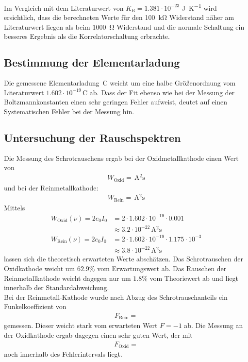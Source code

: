 Im Vergleich mit dem Literaturwert von $K_\text{B} = 1.381 \cdot 10^{-23}$ \si{\joule\per\kelvin} wird ersichtlich, dass die berechneten Werte für den \SI{100}{\kilo\ohm} Widerstand näher am Literaturwert liegen als beim \SI{1000}{\ohm} Widerstand und die normale Schaltung ein besseres Ergebnis als die Korrelatorschaltung erbrachte.
\subsection{Bestimmung der Elementarladung}
Die gemessene Elementarladung $ \, \si{\coulomb}$ weicht um eine halbe Größenordnung vom Literaturwert $1.602\cdot 10^{-19}\,\si{\coulomb}$ ab. Dass der Fit ebenso wie bei der Messung der Boltzmannkonstanten einen sehr geringen Fehler aufweist, deutet auf einen Systematischen Fehler bei der Messung hin.
\subsection{Untersuchung der Rauschspektren}
Die Messung des Schrotrauschens ergab bei der Oxidmetallkathode einen Wert von
\begin{align*}
W_\text{Oxid} = \,\si{\ampere^2\second}
\end{align*}
und bei der Reinmetallkathode:
\begin{align*}
W_\text{Rein} = \,\si{\ampere^2\second}
\end{align*}
Mittels
\begin{align*}
W_\text{Oxid}(\nu) = 2e_0I_0 &= 2\cdot 1.602\cdot10^{-19}\cdot 0.001 \\
&\approx 3.2\cdot10^{-22}\,\si{\ampere^2\second}\\
W_\text{Rein}(\nu) = 2e_0I_0 &= 2\cdot 1.602\cdot10^{-19}\cdot 1.175 \cdot10^{-3} \\
&\approx 3.8\cdot10^{-22}\,\si{\ampere^2\second}
\end{align*}
lassen sich die theoretisch erwarteten Werte abschätzen. Das Schrotrauschen der Oxidkathode weicht um $62.9\%$ vom Erwartungswert ab. Das Rauschen der Reinmetallkathode weicht dagegen nur um $1.8\%$ vom Theoriewert ab und liegt innerhalb der Standardabweichung.\\

Bei der Reinmetall-Kathode wurde nach Abzug des Schrotrauschanteils ein Funkelkoeffizient von
\begin{align*}
	F_\text{Rein} = 
\end{align*}
gemessen. Dieser weicht stark vom erwarteten Wert $F=-1$ ab. Die Messung an der Oxidkathode ergab dagegen einen sehr guten Wert, der mit
\begin{align*}
F_\text{Oxid} = 
\end{align*}
noch innerhalb des Fehlerintervals liegt.

